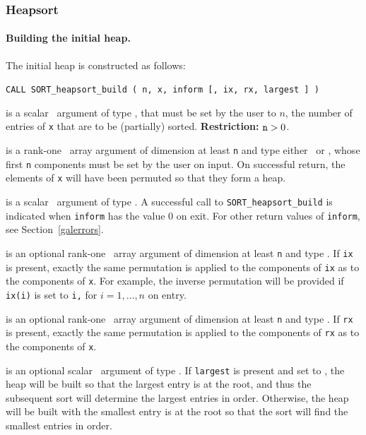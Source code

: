 \documentclass{galahad}
\newcommand{\packagename}{SORT}
\begin{document}

\subsubsection{Heapsort}

\paragraph{Building the initial heap.}
The initial heap is constructed as follows:
\vspace*{1mm}

\hspace{8mm}
{\tt CALL \packagename\_heapsort\_build ( n, x, inform [, ix, rx, largest ] )}

\vspace*{-3mm}
\begin{description}
 is a scalar \intentin\ argument of type
\integer, that must be set by the user to $n$, the
number of entries of {\tt x} that are to be (partially) sorted.
{\bf Restriction:} ${\tt n} > 0$.

 is a rank-one \intentinout\ array argument of
dimension at least {\tt n} and type either
\integer\ or \realdp, whose first {\tt n} components  must be set by
the user on input. On successful return, the elements of {\tt x} will have
been permuted so that they form a heap.

 is a scalar \intentout\ argument of type \integer.
A successful call to {\tt \packagename\_heapsort\_build}
is indicated when {\tt inform} has the value 0 on exit.
For other return values of {\tt inform}, see Section~\ref{galerrors}.

 is an optional rank-one \intentinout\ array argument of
dimension at least {\tt n} and type \integer.
If {\tt ix} is present, exactly the same permutation is applied to the
components of {\tt ix} as to the components of {\tt x}.
For example, the inverse permutation will be
provided if {\tt ix(i)} is set to {\tt i,} for $i = 1, \ldots, n$
on entry.

 is an optional rank-one \intentinout\ array argument of
dimension at least {\tt n} and type \realdp.
If {\tt rx} is present, exactly the same permutation is applied to the
components of {\tt rx} as to the components of {\tt x}.

 is an optional scalar \intentin\ argument
of type \logical.
If {\tt largest} is present and set to \true, the heap will be built so
that the largest entry is at the root, and thus the subsequent sort will
determine the largest entries in order. Otherwise, the heap will be
built with the smallest entry is at the root so that the sort will
find the smallest entries in order.
\end{description}
\end{document}
